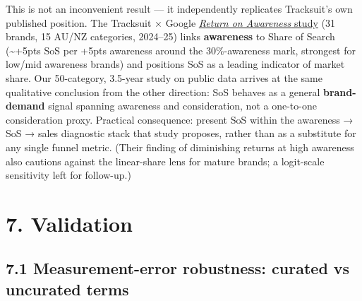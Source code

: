 \documentclass[
]{article}
\begin{document}
This is not an inconvenient result --- it independently replicates
Tracksuit's own published position. The Tracksuit × Google
\href{https://www.gotracksuit.com/report/return-on-awareness}{\emph{Return
on Awareness} study} (31 brands, 15 AU/NZ categories, 2024--25) links
\textbf{awareness} to Share of Search (\textasciitilde+5pts SoS per
+5pts awareness around the 30\%-awareness mark, strongest for low/mid
awareness brands) and positions SoS as a leading indicator of market
share. Our 50-category, 3.5-year study on public data arrives at the
same qualitative conclusion from the other direction: SoS behaves as a
general \textbf{brand-demand} signal spanning awareness and
consideration, not a one-to-one consideration proxy. Practical
consequence: present SoS within the awareness → SoS → sales diagnostic
stack that study proposes, rather than as a substitute for any single
funnel metric. (Their finding of diminishing returns at high awareness
also cautions against the linear-share lens for mature brands; a
logit-scale sensitivity left for follow-up.)

\hypertarget{validation}{%
\section{7. Validation}\label{validation}}

\hypertarget{measurement-error-robustness-curated-vs-uncurated-terms}{%
\subsection{7.1 Measurement-error robustness: curated vs uncurated
terms}\label{measurement-error-robustness-curated-vs-uncurated-terms}}
\end{document}
